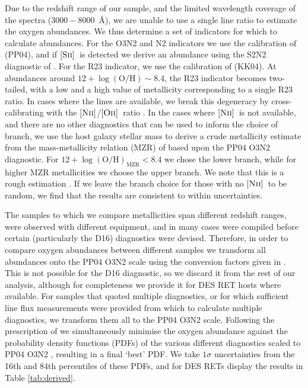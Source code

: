 \documentclass[fleqn,usenatbib,]{mnras}
\newcommand{\replychris}[1]{\color{magenta}#1 \color{black}}
\newcommand{\replylluis}[1]{\color{brown}#1 \color{black}}
\newcommand{\OII}[0]{$[\textnormal{\textsc{Oii}}]$}
\newcommand{\SII}[0]{$[\textnormal{\textsc{Sii}}]$}
\newcommand{\NII}[0]{$[\textnormal{\textsc{Nii}}]$}
\begin{document}
Due to the redshift range of our sample, and the limited wavelength coverage of the spectra ($3000-8000$~\AA), we are unable to use a single line ratio to estimate the oxygen abundances. We thus determine a set of indicators for which to calculate abundances. For the O3N2 and N2 indicators we use the calibration of \citet{Pettini2004} (PP04), and if \SII~is detected we derive an abundance using the S2N2 diagnostic of \citet{Dopita2016}. For the R23 indicator, we use the calibration of \citet{Kobulnicky2004} (KK04). At abundances around $12 + \log \mathrm{(O/H)} \sim 8.4$, the R23 indicator becomes two-tailed, with a low and a high value of metallicity corresponding to a single R23 ratio. In cases where the lines are available, we break this degeneracy by cross-calibrating with the \NII/\OII~ratio \citep{Kewley2008}. In the cases where \NII~is not available, and there are no other diagnostics that can be used to inform the choice of branch, we use the host galaxy stellar mass to derive a crude metallicity estimate from the mass-metallicity relation (MZR) of \citet{Kewley2008} based upon the PP04 O3N2 diagnostic. For $12 + \log \mathrm{(O/H)}_{\mathrm{MZR}} < 8.4$ we chose the lower branch, while for higher MZR metallicities we choose the upper branch. \replychris{We note that this is a rough estimation}. If we leave the branch choice for those with no \NII~to be random, we find that the results are consistent to within uncertainties. 

The samples to which we compare metallicities span different redshift ranges, were observed with different equipment, and in many cases were compiled before certain (particularly the D16) diagnostics were devised. Therefore, in order to compare oxygen abundances between different samples we transform all abundances onto the PP04 O3N2 scale using the conversion factors given in \citet{Kewley2008}. This is not possible for the D16 diagnostic, so we discard it from the rest of our analysis, although for completeness we provide it for DES RET hosts where available. For samples that quoted multiple diagnostics, or for which sufficient line flux measurements were provided from which to calculate multiple diagnostics, we transform them all to the PP04 O3N2 scale. Following the prescription of \citet{Kruehler2015} we simultaneously minimise the oxygen abundance against the probability density functions (PDFs) of the various different diagnostics \replylluis{scaled to PP04 O3N2}, resulting in a final `best' PDF. We take $1\sigma$ uncertainties from the 16th and 84th percentiles of these PDFs, and \replylluis{for DES RETs} display the results in Table \ref{tab:derived}.
\end{document}
